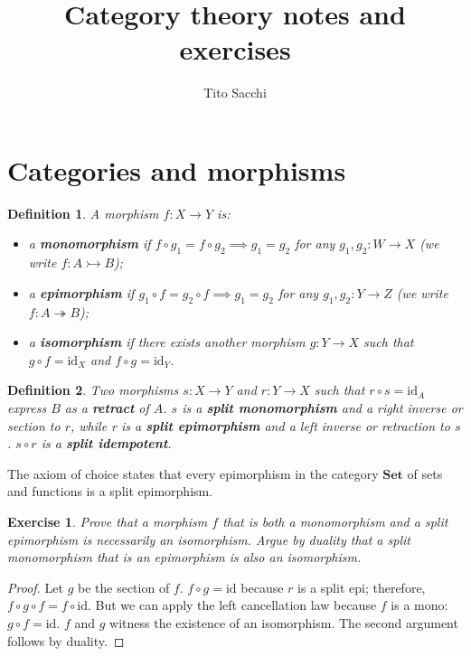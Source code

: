 \documentclass[a5paper,oneside,11pt]{article}
\title{Category theory notes and exercises}
\author{Tito Sacchi}
\newtheorem{ex}{Exercise}
\newtheorem{defn}{Definition}
\newcommand\id{\mathord{\mathrm{id}}}
\newcommand\1{\mathord{\mathrm{1}}}
\newcommand\cat[1]{\mathbf{#1}}
\begin{document}
\maketitle

\section{Categories and morphisms}
\begin{defn}
\label{defn:monoepi}
A morphism $f : X \rightarrow Y$ is:
\begin{itemize}
    \item a \textbf{monomorphism} if $ f \circ g_1 = f \circ g_2 \implies g_1 = g_2$
        for any $g_1, g_2 : W \rightarrow X$ (we write $f : A \rightarrowtail B$);
    \item a \textbf{epimorphism}  if $ g_1 \circ f = g_2 \circ f \implies g_1 = g_2$
        for any $g_1, g_2 : Y \rightarrow Z$ (we write $f : A \twoheadrightarrow B$);
    \item a \textbf{isomorphism} if there exists another morphism $g : Y \rightarrow X$
        such that $g \circ f = \id_X$ and $f \circ g = \id_Y$.
\end{itemize}
\end{defn}
\begin{defn}
\label{defn:split}
Two morphisms $s : X \rightarrow Y$ and $r : Y \rightarrow X$ such that
$r \circ s = \id_A$ express $B$ as a \textbf{retract} of $A$. $s$ is
a \textbf{split monomorphism} and a right inverse or section to $r$,
while r is a \textbf{split epimorphism} and a left inverse or retraction to $s$.
$s \circ r$ is a \textbf{split idempotent}.
\end{defn}

The axiom of choice states that every epimorphism in the category $\cat{Set}$ of
sets and functions is a split epimorphism.

\begin{ex}
    Prove that a morphism $f$ that is both a monomorphism and a split
    epimorphism is necessarily an isomorphism.
    Argue by duality that a split monomorphism that is an epimorphism is also
    an isomorphism.
\end{ex}
\begin{proof}
    Let $g$ be the section of $f$.
    $f \circ g = \id$ because $r$ is a split epi; therefore,
    $f \circ g \circ f = f \circ \id$.
    But we can apply the left cancellation law because $f$ is a mono: $g \circ f = \id$.
    $f$ and $g$ witness the existence of an isomorphism.
    The second argument follows by duality.
\end{proof}
\end{document}
